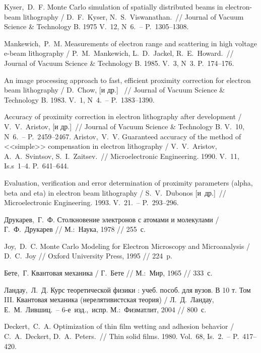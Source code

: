 \begin{thebibliography}{99}
 \tabfix Kyser,~D.~F. Monte Carlo simulation of spatially
distributed beams in electron-beam lithography / D.~F.~Kyser,
N.~S.~Viswanathan.~// Journal of Vacuum Science \& Technology B. 1975 V.~12,
N~6.~-- P.~1305--1308.

 \tabfix Mankewich,~P.~M. Measurements of electron range and scattering in
high voltage e-beam lithography / P.~M.~Mankewich, L.~D.~Jackel,
R.~E.~Howard.~// Journal of Vacuum Science \& Technology B. 1985. V.~3, N~3.
P.~174--176.

 \tabfix An image processing approach to fast, efficient proximity correction for
electron beam lithography / D.~Chow, [и др.] ~// Journal of Vacuum Science \& Technology B. 1983.
V.~1, N~4.~-- P.~1383--1390.%

 \tabfix Accuracy of proximity correction in electron lithography after
development / V.~V.~Aristov, [и др.]~// Journal of Vacuum Science \& Technology B. V.~10,
N~6.~-- P.~2459--2467.
 \tabfix Aristov,~V.~V. Guaranteed accuracy of the method of <<simple>>
compensation in electron lithography / V.~V.~Aristov, A.~A.~Svintsov,
S.~I.~Zaitsev.~// Microelectronic Engineering. 1990. V.~11, Is.s~1--4.
P.~641--644.

 \tabfix Evaluation, verification and error determination of proximity
parameters (alpha, beta and eta) in electron beam lithography / S.~V.~Dubonos [и~др.]~// Microelectronic
Engineering. 1993. V.~21.~-- P.~293--296.%

 \tabfix Друкарев,~Г.~Ф. Столкновение электронов с атомами и молекулами /
Г.~Ф.~Друкарев // М.:~Наука, 1978 // 255~с.

 \tabfix Joy,~D.~C. Monte Carlo Modeling for Electron Microscopy and
Microanalysis / D.~C.~Joy // Oxford University Press, 1995 // 224~p.

 \tabfix Бете,~Г. Квантовая механика / Г.~Бете // М.:~Мир, 1965 // 333~с.

 \tabfix Ландау,~Л.~Д. Курс теоретической физики : учеб. пособ. для вузов.
В 10 т. Том III. Квантовая механика (нерелятивистская теория) / Л.~Д.~Ландау, Е.~М.~Лившиц.~--
6-е~изд.,~испр. М.:~Физматлит, 2004 // 800~с.

 \tabfix Deckert,~C.~A. Optimization of thin film wetting and adhesion
behavior / C.~A.~Deckert, D.~A.~Peters.~// Thin solid films. 1980. Vol.~68,
Is.~2.~-- P.~417--420.


\end{thebibliography}
